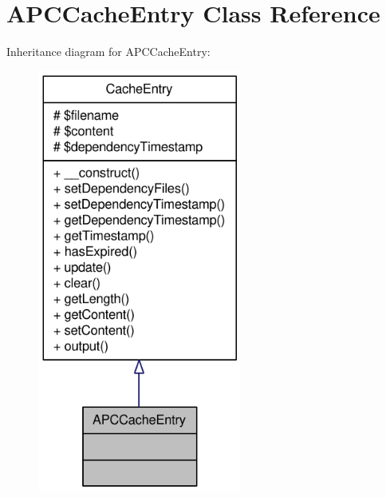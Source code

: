 \hypertarget{classAPCCacheEntry}{
\section{APCCacheEntry Class Reference}
\label{classAPCCacheEntry}
}


Inheritance diagram for APCCacheEntry:\nopagebreak
\begin{figure}[H]
\begin{center}
\leavevmode
\includegraphics[width=190pt]{classAPCCacheEntry__inherit__graph}
\end{center}
\end{figure}


